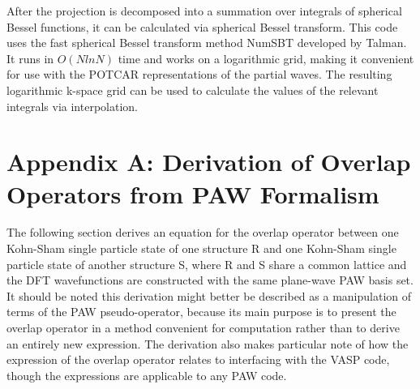 \documentclass[12pt]{article}
\begin{document}
After the projection is decomposed into a summation over integrals of spherical
Bessel functions, it can be calculated via spherical Bessel transform. This code
uses the fast spherical Bessel transform method NumSBT developed by Talman.\cite{TALMAN}
It runs in $O(NlnN)$ time and works on a logarithmic grid, making it convenient for use with
the POTCAR representations of the partial waves. The resulting logarithmic k-space
grid can be used to calculate the values of the relevant integrals via interpolation.

\section*{Appendix A: Derivation of Overlap Operators from PAW Formalism}

The following section derives an equation for the overlap operator between one
Kohn-Sham single particle state of one structure R and one Kohn-Sham single
particle state of another structure S, where R and S share a common lattice
and the DFT wavefunctions are constructed with the same plane-wave PAW basis set.
It should be noted this derivation might better be described as a manipulation
of terms of the PAW pseudo-operator, because its main purpose is to present
the overlap operator in a method convenient for computation rather than to derive
an entirely new expression. The derivation also makes particular note of how
the expression of the overlap operator relates to interfacing with the VASP code,
though the expressions are applicable to any PAW code.
\end{document}
